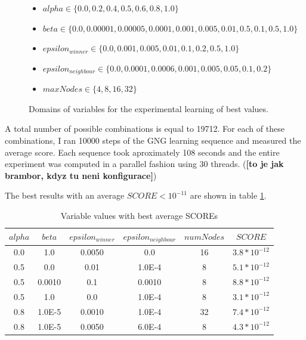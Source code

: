 \begin{figure}          
\begin{itemize}
\item $alpha \in \{0.0, 0.2, 0.4, 0.5, 0.6, 0.8, 1.0\}$
\item $beta \in \{0.0, 0.00001, 0.00005, 0.0001, 0.001, 0.005, 0.01, 0.5, 0.1, 0.5, 1.0\}$
\item $epsilon_{winner} \in \{0.0, 0.001, 0.005, 0.01, 0.1, 0.2, 0.5, 1.0\}$
\item $epsilon_{neighbour} \in \{0.0, 0.0001, 0.0006, 0.001, 0.005, 0.05, 0.1, 0.2\}$
\item $maxNodes \in \{4, 8, 16, 32\}$
\end{itemize}
\caption{Domains of variables for the experimental learning of best values.}
\label{usedalgo:gngexperimentdomains}
\end{figure}

A total number of possible combinations is equal to 19712. For each of these combinations, I ran 10000 steps of the GNG learning sequence and measured the average score. Each sequence took aproximately 108 seconds and the entire experiment was computed in a parallel fashion using 30 threads. (\textbf{[to je jak brambor, kdyz tu neni konfigurace]})

The best results with an average $SCORE < 10^{-11}$ are shown in table \ref{usedalgo:gngexperimentresults}.

\begin{table}
\begin{center}
\begin{tabular}{ccccc|c}

$alpha$ & $beta$ & $epsilon_{winner}$ & $epsilon_{neighbour}$ & $numNodes$ & $SCORE$ \\
\hline
0.0 & 1.0 & 0.0050 & 0.0 & 16 & $3.8*10^{-12}$ \\
0.5 & 0.0 & 0.01 & 1.0E-4 & 8 & $5.1*10^{-12}$ \\   
0.5 & 0.0010 & 0.1 & 0.0010 & 8 & $8.8*10^{-12}$ \\ 
0.5 & 1.0 & 0.0 & 1.0E-4 & 8 & $3.1*10^{-12}$ \\     
0.8 & 1.0E-5 & 0.0010 & 1.0E-4 & 32 & $7.4*10^{-12}$ \\
0.8 & 1.0E-5 & 0.0050 & 6.0E-4 & 8 & $4.3*10^{-12}$ \\

\end{tabular}      
\caption{\label{usedalgo:gngexperimentresults}Variable values with best average SCOREs}
\end{center}
\end{table}

